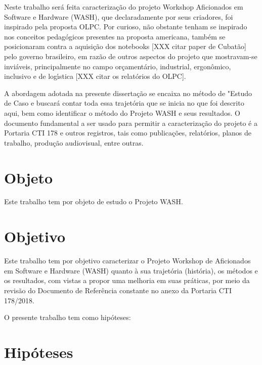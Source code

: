 \documentclass[
12pt,		%
openright,	%
twoside,  %
a4paper,			%
chapter=TITLE,		%
english,			%
french,				%
spanish,			%
brazil				%
]{USPSC-classe/USPSC}
\begin{document}
Neste trabalho ser\'a feita caracteriza\c{c}\~ao do projeto Workshop Aficionados em Software e Hardware (WASH), que declaradamente por seus criadores, foi inspirado pela proposta OLPC. Por curioso, n\~ao obstante tenham se inspirado nos conceitos pedag\'ogicos presentes na proposta americana, tamb\'em se posicionaram contra a aquisi\c{c}\~ao dos notebooks [XXX citar paper de Cubat\~ao] pelo governo brasileiro, em raz\~ao de outros aspectos do projeto que mostravam-se invi\'aveis, principalmente no campo or\c{c}ament\'ario, industrial, ergon\^omico, inclusivo e de log\'{\i}stica [XXX citar os relat\'orios do OLPC].




A abordagem adotada na presente disserta\c{c}\~ao se encaixa no m\'etodo de "Estudo de Caso e buscar\'a contar toda essa trajet\'oria que se inicia no que foi descrito aqui, bem como identificar o m\'etodo do Projeto WASH e seus resultados. O documento fundamental a ser usado para permitir a caracteriza\c{c}\~ao do projeto \'e a Portaria CTI 178 e outros registros, tais como publica\c{c}\~oes, relat\'orios, planos de trabalho, produ\c{c}\~ao audiovisual, entre outras.




\section[Objeto]{Objeto}\label{Objeto}
Este trabalho tem por objeto de estudo o  Projeto WASH.




\section[Objetivo]{Objetivo}\label{Objetivo}
Este trabalho tem por objetivo caracterizar  o Projeto Workshop de Aficionados em Software e Hardware (WASH) quanto \`a sua trajet\'oria (hist\'oria), os m\'etodos e os resultados, com vistas a propor uma melhoria em suas pr\'aticas, por meio da revis\~ao do  Documento de Refer\^encia constante no anexo da  Portaria CTI 178/2018.




O presente trabalho tem como hip\'oteses:




\section[Hip\'oteses]{Hip\'oteses}\label{Hip\'oteses}
\end{document}

